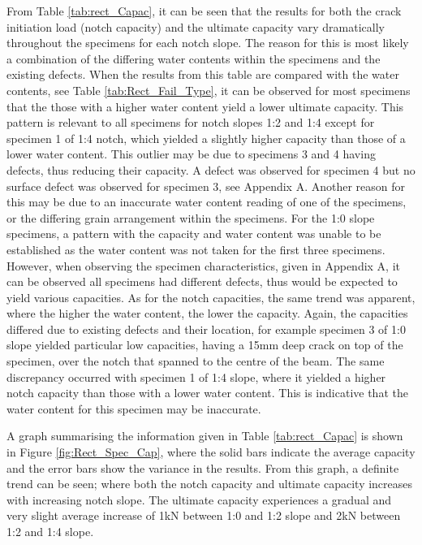 \documentclass[11pt,a4paper]{article}
\numberwithin{equation}{subsection}
\begin{document}
\noindent
From Table \ref{tab:rect_Capac}, it can be seen that the results for both the crack initiation load (notch capacity) and the ultimate capacity vary dramatically throughout the specimens for each notch slope. The reason for this is most likely a combination of the differing water contents within the specimens and the existing defects. When the results from this table are compared with the water contents, see Table \ref{tab:Rect_Fail_Type}, it can be observed for most specimens that the those with a higher water content yield a lower ultimate capacity. This pattern is relevant to all specimens for notch slopes 1:2 and 1:4 except for specimen 1 of 1:4 notch, which yielded a slightly higher capacity than those of a lower water content. This outlier may be due to specimens 3 and 4 having defects, thus reducing their capacity. A defect was observed for specimen 4 but no surface defect was observed for specimen 3, see Appendix A. Another reason for this may be due to an inaccurate water content reading of one of the specimens, or the differing grain arrangement within the specimens. For the 1:0 slope specimens, a pattern with the capacity and water content was unable to be established as the water content was not taken for the first three specimens. However, when observing the specimen characteristics, given in Appendix A, it can be observed all specimens had different defects, thus would be expected to yield various capacities. As for the notch capacities, the same trend was apparent, where the higher the water content, the lower the capacity. Again, the capacities differed due to existing defects and their location, for example specimen 3 of 1:0 slope yielded particular low capacities, having a 15mm deep crack on top of the specimen, over the notch that spanned to the centre of the beam. The same discrepancy occurred with specimen 1 of 1:4 slope, where it yielded a higher notch capacity than those with a lower water content. This is indicative that the water content for this specimen may be inaccurate.  

\vspace*{\baselineskip}

\noindent
A graph summarising the information given in Table \ref{tab:rect_Capac} is shown in Figure \ref{fig:Rect_Spec_Cap}, where the solid bars indicate the average capacity and the error bars show the variance in the results. From this graph, a definite trend can be seen; where both the notch capacity and ultimate capacity increases with increasing notch slope. The ultimate capacity experiences a gradual and very slight average increase of 1kN between 1:0 and 1:2 slope and 2kN between 1:2 and 1:4 slope.  
\end{document}
